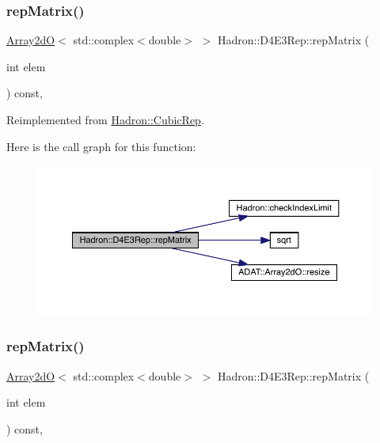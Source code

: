 \subsubsection{\texorpdfstring{repMatrix()}{repMatrix()}\hspace{0.1cm}{\footnotesize\ttfamily [1/2]}}
{\footnotesize\ttfamily \mbox{\hyperlink{classADAT_1_1Array2dO}{Array2dO}}$<$ std\+::complex$<$double$>$ $>$ Hadron\+::\+D4\+E3\+Rep\+::rep\+Matrix (\begin{DoxyParamCaption}\item[{int}]{elem }\end{DoxyParamCaption}) const\hspace{0.3cm}{\ttfamily [inline]}, {\ttfamily [virtual]}}



Reimplemented from \mbox{\hyperlink{structHadron_1_1CubicRep_ac5d7e9e6f4ab1158b5fce3e4ad9e8005}{Hadron\+::\+Cubic\+Rep}}.

Here is the call graph for this function\+:
\nopagebreak
\begin{figure}[H]
\begin{center}
\leavevmode
\includegraphics[width=350pt]{dc/d81/structHadron_1_1D4E3Rep_a313affd6d58648cb82e7095ada7afa8d_cgraph}
\end{center}
\end{figure}
\mbox{\label{structHadron_1_1D4E3Rep_a313affd6d58648cb82e7095ada7afa8d}} 
\subsubsection{\texorpdfstring{repMatrix()}{repMatrix()}\hspace{0.1cm}{\footnotesize\ttfamily [2/2]}}
{\footnotesize\ttfamily \mbox{\hyperlink{classADAT_1_1Array2dO}{Array2dO}}$<$ std\+::complex$<$double$>$ $>$ Hadron\+::\+D4\+E3\+Rep\+::rep\+Matrix (\begin{DoxyParamCaption}\item[{int}]{elem }\end{DoxyParamCaption}) const\hspace{0.3cm}{\ttfamily [inline]}, {\ttfamily [virtual]}}



